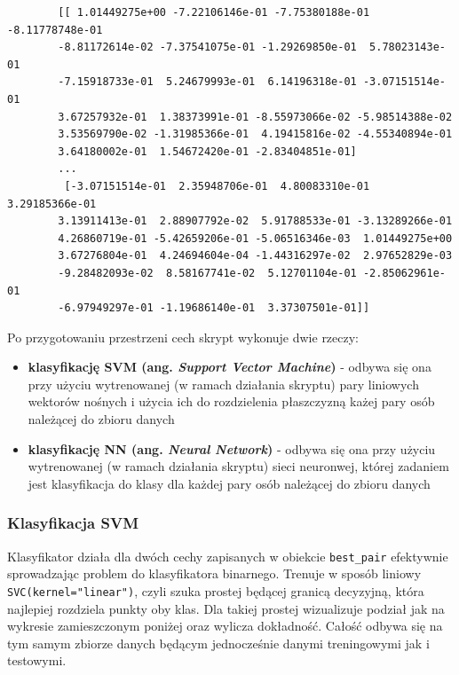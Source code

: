 \begin{center}
    \begin{verbatim}
        [[ 1.01449275e+00 -7.22106146e-01 -7.75380188e-01 -8.11778748e-01
        -8.81172614e-02 -7.37541075e-01 -1.29269850e-01  5.78023143e-01
        -7.15918733e-01  5.24679993e-01  6.14196318e-01 -3.07151514e-01
        3.67257932e-01  1.38373991e-01 -8.55973066e-02 -5.98514388e-02
        3.53569790e-02 -1.31985366e-01  4.19415816e-02 -4.55340894e-01
        3.64180002e-01  1.54672420e-01 -2.83404851e-01]
        ...
         [-3.07151514e-01  2.35948706e-01  4.80083310e-01  3.29185366e-01
        3.13911413e-01  2.88907792e-02  5.91788533e-01 -3.13289266e-01
        4.26860719e-01 -5.42659206e-01 -5.06516346e-03  1.01449275e+00
        3.67276804e-01  4.24694604e-04 -1.44316297e-02  2.97652829e-03
        -9.28482093e-02  8.58167741e-02  5.12701104e-01 -2.85062961e-01
        -6.97949297e-01 -1.19686140e-01  3.37307501e-01]]
    \end{verbatim}
\end{center}

Po przygotowaniu przestrzeni cech skrypt wykonuje dwie rzeczy:
\begin{itemize}
    \item {\textbf{klasyfikację SVM (ang. {\textit{Support Vector Machine}})} - odbywa 
    się ona przy użyciu wytrenowanej (w ramach działania skryptu) pary liniowych 
    wektorów nośnych i użycia ich do rozdzielenia płaszczyzną każej pary osób należącej do zbioru
    danych}
    \item {\textbf{klasyfikację NN (ang. {\textit{Neural Network}})} - odbywa 
    się ona przy użyciu wytrenowanej (w ramach działania skryptu) sieci neuronwej, której
    zadaniem jest klasyfikacja do klasy dla każdej pary osób należącej do zbioru danych}
\end{itemize} 

\subsubsection{Klasyfikacja SVM}
Klasyfikator działa dla dwóch cechy zapisanych w obiekcie \verb|best_pair| efektywnie
sprowadzając problem do klasyfikatora binarnego. Trenuje w sposób liniowy 
\verb|SVC(kernel="linear")|, czyli szuka prostej będącej granicą decyzyjną, która
najlepiej rozdziela punkty oby klas. Dla takiej prostej wizualizuje podział 
jak na wykresie zamieszczonym poniżej oraz wylicza dokładność. Całość odbywa się
na tym samym zbiorze danych będącym jednocześnie danymi treningowymi jak i testowymi.

